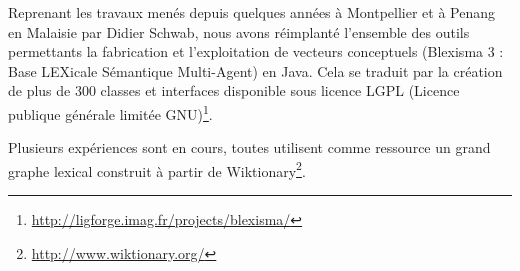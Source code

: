 
Reprenant les travaux menés depuis quelques années à Montpellier et à Penang en Malaisie par Didier Schwab, nous avons réimplanté l'ensemble des outils permettants la fabrication et l'exploitation de vecteurs conceptuels (Blexisma 3 : Base LEXicale Sémantique Multi-Agent) en Java. Cela se traduit par la création de plus de 300 classes et interfaces disponible sous licence LGPL (Licence publique générale limitée GNU)\footnote{\url{http://ligforge.imag.fr/projects/blexisma/}}.

Plusieurs expériences sont en cours, toutes utilisent comme ressource un grand graphe lexical construit à partir de Wiktionary\footnote{\url{http://www.wiktionary.org/}}. 

